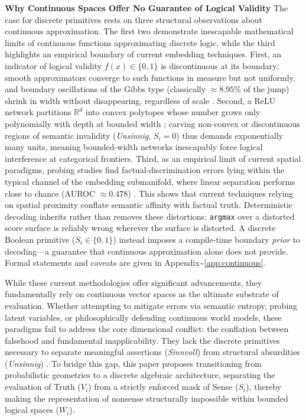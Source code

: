 \documentclass{article}
\begin{document}
\textbf{Why Continuous Spaces Offer No Guarantee of Logical Validity}
The case for discrete primitives rests on three structural observations
about continuous approximation. The first two demonstrate inescapable
mathematical limits of continuous functions approximating discrete
logic, while the third highlights an empirical boundary of current
embedding techniques. First, an indicator of logical validity
\(f(x) \in \{0, 1\}\) is discontinuous at its boundary; smooth
approximators converge to such functions in measure but not uniformly,
and boundary oscillations of the Gibbs type (classically
\(\approx 8.95\%\) of the jump) shrink in width without disappearing,
regardless of scale \citep{hornik1991approximation}. Second, a ReLU
network partitions \(\mathbb{R}^d\) into convex polytopes whose number
grows only polynomially with depth at bounded width
\citep{hanin2017universal}; carving non-convex or discontinuous regions
of semantic invalidity (\emph{Unsinnig}, \(S_i = 0\)) thus demands
exponentially many units, meaning bounded-width networks inescapably
force logical interference at categorical frontiers. Third, as an
empirical limit of current spatial paradigms, probing studies find
factual-discrimination errors lying within the typical channel of the
embedding submanifold, where linear separation performs close to chance
(AUROC \(\approx 0.478\)) \citep{wei2024measuring}. This shows that
current techniques relying on spatial proximity conflate semantic
affinity with factual truth. Deterministic decoding inherits rather than
removes these distortions: \texttt{argmax} over a distorted score
surface is reliably wrong wherever the surface is distorted. A discrete
Boolean primitive (\(S_i \in \{0, 1\}\)) instead imposes a compile-time
boundary \emph{prior} to decoding---a guarantee that continuous
approximation alone does not provide. Formal statements and caveats are
given in Appendix\textasciitilde{}\ref{app:continuous}.

While these current methodologies offer significant advancements, they
fundamentally rely on continuous vector spaces as the ultimate substrate
of evaluation. Whether attempting to mitigate errors via semantic
entropy, probing latent variables, or philosophically defending
continuous world models, these paradigms fail to address the core
dimensional conflict: the conflation between falsehood and fundamental
inapplicability. They lack the discrete primitives necessary to separate
meaningful assertions (\emph{Sinnvoll}) from structural absurdities
(\emph{Unsinnig}) \citep{wittgenstein1922}. To bridge this gap, this
paper proposes transitioning from probabilistic geometries to a discrete
algebraic architecture, separating the evaluation of Truth (\(V_i\))
from a strictly enforced mask of Sense (\(S_i\)), thereby making the
representation of nonsense structurally impossible within bounded
logical spaces (\(W_i\)).
\end{document}

